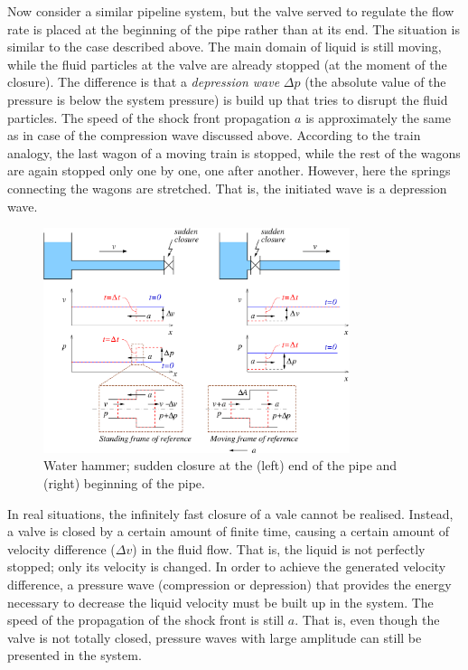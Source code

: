 Now consider a similar pipeline system, but the valve served to regulate the flow rate is placed at the beginning of the pipe rather than at its end. The situation is similar to the case described above. The main domain of liquid is still moving, while the fluid particles at the valve are already stopped (at the moment of the closure). The difference is that a \emph{depression wave} $\Delta p$ (the absolute value of the pressure is below the system pressure) is build up that tries to disrupt the fluid particles. The speed of the shock front propagation $a$ is approximately the same as in case of the compression wave discussed above. According to the train analogy, the last wagon of a moving train is stopped, while the rest of the wagons are again stopped only one by one, one after another. However, here the springs connecting the wagons are stretched. That is, the initiated wave is a depression wave.

\begin{figure}[h!]
\centering
\includegraphics[width=0.8\textwidth]{figs/water_hammer_CV.pdf}
\caption{\label{fig:water_hammer}Water hammer; sudden closure at the (left) end of the pipe and (right) beginning of the pipe.}
\end{figure}

In real situations, the infinitely fast closure of a vale cannot be realised. Instead, a valve is closed by a certain amount of finite time, causing a certain amount of velocity difference ($\Delta v$) in the fluid flow. That is, the liquid is not perfectly stopped; only its velocity is changed. In order to achieve the generated velocity difference, a pressure wave (compression or depression) that provides the energy necessary to decrease the liquid velocity must be built up in the system. The speed of the propagation of the shock front is still $a$. That is, even though the valve is not totally closed, pressure waves with large amplitude can still be presented in the system.

